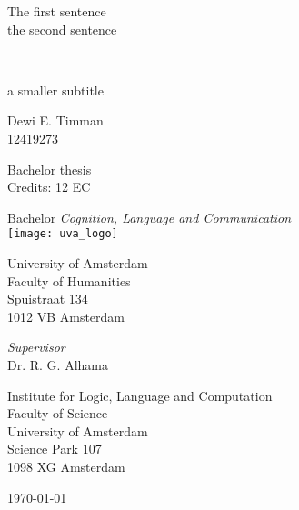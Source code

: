 \documentclass[a4paper, 12pt]{report}
\newcommand{\theTitle}{The first sentence \\
\vspace{0.5em}
the second sentence}
\newcommand{\theSubTitle}{a smaller subtitle}
\newcommand{\theAuthor}{Dewi E. Timman}
\newcommand{\theStudentID}{12419273}
\newcommand{\theSupervisor}{Dr. R. G. Alhama} %
\newcommand{\theInstitute}{
Institute for Logic, Language and Computation \\ %
Faculty of Science\\
University of Amsterdam\\
Science Park 107 \\ 
1098 XG Amsterdam 
}
\newcommand{\theDate}{\today}
\begin{document}
\pagestyle{empty}
\begin{center}

\vspace{2.5cm}


\begin{Huge}
\theTitle
\end{Huge} \\

\vspace{0.5 cm}

\begin{Large}
\theSubTitle
\end{Large}

\vspace{1.5cm}

\theAuthor\\
\theStudentID

\vspace{1.5cm}

Bachelor thesis\\
Credits: 12 EC

\vspace{0.5cm}

Bachelor \textit{Cognition, Language and Communication} \\
\vspace{0.25cm}
\texttt{[image: uva\_logo]} \\
\vspace{0.1cm}

University of Amsterdam\\
Faculty of Humanities\\
Spuistraat 134\\
1012 VB Amsterdam

\vspace{2cm}

\emph{Supervisor}\\

\theSupervisor

\vspace{0.25cm}

\theInstitute

\vspace{1.0cm}

\theDate

\end{center}
\newpage
\end{document}
